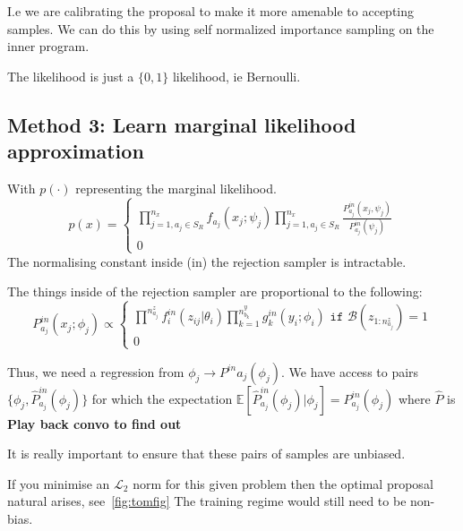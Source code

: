 \documentclass{article}
\begin{document}
I.e we are calibrating the proposal to make it more amenable to accepting samples. 
We can do this by using self normalized importance sampling on the inner program. 

The likelihood is just a $\{0,1\}$ likelihood, ie Bernoulli. 

\subsection{Method 3: Learn marginal likelihood approximation}
With $ p(\cdot)$ representing the marginal likelihood. 
\begin{equation}
  p(x) = 
  \begin{cases}
  \prod^{n_x}_{j=1,{a_j}\in S_{R}} f_{a_j}(x_j ; \psi_j) \prod^{n_x}_{j=1,{a_j}\in S_{R}} \frac{P^{in}_{a_j}(x_j,\psi_j)}{P^{in}_{a_j}(\psi_j)} \\
  0
  \end{cases}
\end{equation}
The normalising constant inside (in) the rejection sampler is intractable. 

The things inside of the rejection sampler are proportional to the following:
\begin{equation}
  P_{a_j}^{in}(x_j ; \phi_j) \propto
  \begin{cases}
  \prod^{n^{z}_{a_j}} f^{in}_{i}(z_{ij} | \theta_i) \prod_{k=1}^{n^{y}_{b_k}}g^{in}_{k}(y_i ; \phi_{i}) \texttt{ if } \mathcal{B}(z_{1:n^{z}_{a_j}}) = 1 \\
  0
  \end{cases}
\end{equation}

Thus, we need a regression from $\phi_j \rightarrow P^{in}{a_j}(\phi_j) $.
We have access to pairs $\{\phi_j, \hat{P}^{in}_{a_j}(\phi_j)\}$ for which 
the expectation $\mathbb{E}[\hat{P}^{in}_{a_j}( \phi_j)| \phi_j] = P^{in}_{a_j} (\phi_j)$ where
$\hat{P}$ is \textbf{Play back convo to find out}

It is really important to ensure that these pairs of samples are unbiased. 

If you minimise an $\mathcal{L}_2$ norm for this given problem then the optimal proposal natural arises, see~\ref{fig:tomfig} 
The training regime would still need to be non-bias. 
\end{document}
